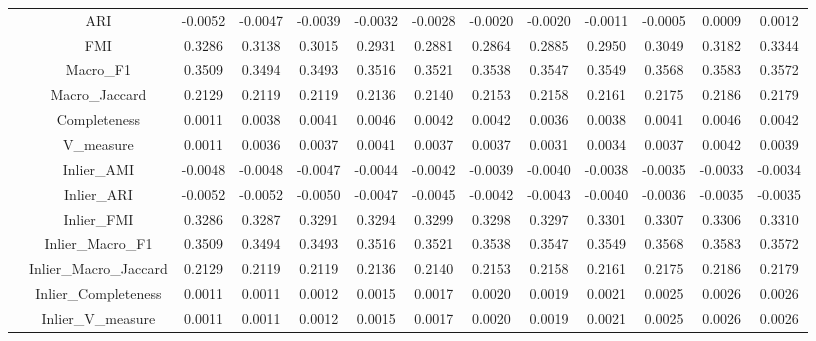 \begin{table}[ht!]
\begin{tabular*}{\linewidth}{@{} lc c c c c c c c c c c c @{}}
 & ARI  & -0.0052 & -0.0047 & -0.0039 & -0.0032 & -0.0028 & -0.0020 & -0.0020 & -0.0011 & -0.0005 & 0.0009 & 0.0012 \\

 & FMI  & 0.3286 & 0.3138 & 0.3015 & 0.2931 & 0.2881 & 0.2864 & 0.2885 & 0.2950 & 0.3049 & 0.3182 & 0.3344 \\

 & Macro_F1  & 0.3509 & 0.3494 & 0.3493 & 0.3516 & 0.3521 & 0.3538 & 0.3547 & 0.3549 & 0.3568 & 0.3583 & 0.3572 \\

 & Macro_Jaccard  & 0.2129 & 0.2119 & 0.2119 & 0.2136 & 0.2140 & 0.2153 & 0.2158 & 0.2161 & 0.2175 & 0.2186 & 0.2179 \\

 & Completeness  & 0.0011 & 0.0038 & 0.0041 & 0.0046 & 0.0042 & 0.0042 & 0.0036 & 0.0038 & 0.0041 & 0.0046 & 0.0042 \\

 & V_measure  & 0.0011 & 0.0036 & 0.0037 & 0.0041 & 0.0037 & 0.0037 & 0.0031 & 0.0034 & 0.0037 & 0.0042 & 0.0039 \\

 & Inlier_AMI  & -0.0048 & -0.0048 & -0.0047 & -0.0044 & -0.0042 & -0.0039 & -0.0040 & -0.0038 & -0.0035 & -0.0033 & -0.0034 \\

 & Inlier_ARI  & -0.0052 & -0.0052 & -0.0050 & -0.0047 & -0.0045 & -0.0042 & -0.0043 & -0.0040 & -0.0036 & -0.0035 & -0.0035 \\

 & Inlier_FMI  & 0.3286 & 0.3287 & 0.3291 & 0.3294 & 0.3299 & 0.3298 & 0.3297 & 0.3301 & 0.3307 & 0.3306 & 0.3310 \\

 & Inlier_Macro_F1  & 0.3509 & 0.3494 & 0.3493 & 0.3516 & 0.3521 & 0.3538 & 0.3547 & 0.3549 & 0.3568 & 0.3583 & 0.3572 \\

 & Inlier_Macro_Jaccard  & 0.2129 & 0.2119 & 0.2119 & 0.2136 & 0.2140 & 0.2153 & 0.2158 & 0.2161 & 0.2175 & 0.2186 & 0.2179 \\

 & Inlier_Completeness  & 0.0011 & 0.0011 & 0.0012 & 0.0015 & 0.0017 & 0.0020 & 0.0019 & 0.0021 & 0.0025 & 0.0026 & 0.0026 \\

 & Inlier_V_measure  & 0.0011 & 0.0011 & 0.0012 & 0.0015 & 0.0017 & 0.0020 & 0.0019 & 0.0021 & 0.0025 & 0.0026 & 0.0026 \\


\end{tabular*}
\end{table}
